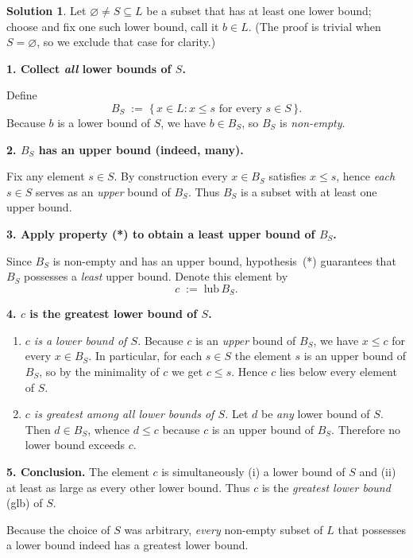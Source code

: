 \documentclass[12pt]{article}
\theoremstyle{definition} %
\newtheorem{solution}{Solution}
\theoremstyle{plain} %
\begin{document}
        \begin{solution}
        Let $\varnothing\neq S\subseteq L$ be a subset that has at least one lower bound;
        choose and fix one such lower bound, call it $b\in L$.
        (The proof is trivial when $S=\varnothing$, so we exclude that case for clarity.)
        
        \medskip
        \textbf{1.  Collect \emph{all} lower bounds of $S$.}
        
        Define
        \[
           B_S\;:=\;\bigl\{\,x\in L : x\le s \text{ for every } s\in S\,\bigr\}.
        \]
        Because $b$ is a lower bound of $S$, we have $b\in B_S$,
        so $B_S$ is \emph{non-empty}.
        
        \medskip
        \textbf{2.  $B_S$ has an upper bound (indeed, many).}
        
        Fix any element $s\in S$.
        By construction every $x\in B_S$ satisfies $x\le s$,
        hence \emph{each} $s\in S$ serves as an \emph{upper} bound of $B_S$.
        Thus $B_S$ is a subset with at least one upper bound.
        
        \medskip
        \textbf{3.  Apply property (*) to obtain a least upper bound of $B_S$.}
        
        Since $B_S$ is non-empty and has an upper bound,
        hypothesis~(*) guarantees that $B_S$ possesses a \emph{least} upper bound.
        Denote this element by
        \[
           c\;:=\;\text{lub}\, B_S.
        \]
        
        \medskip
        \textbf{4.  $c$ is the greatest lower bound of $S$.}
        
        \begin{enumerate}[label=(\alph*)]
        \item \emph{$c$ is a lower bound of $S$.}  
              Because $c$ is an \emph{upper} bound of $B_S$, we have $x\le c$ for every $x\in B_S$.
              In particular, for each $s\in S$ the element $s$ is an upper bound of $B_S$,
              so by the minimality of $c$ we get $c\le s$.
              Hence $c$ lies below every element of $S$.
        
        \item \emph{$c$ is \emph{greatest} among all lower bounds of $S$.}  
              Let $d$ be \emph{any} lower bound of $S$.
              Then $d\in B_S$, whence $d\le c$ because $c$ is an upper bound of $B_S$.
              Therefore no lower bound exceeds $c$.
        \end{enumerate}
        
        \medskip
        \textbf{5.  Conclusion.}
        The element $c$ is simultaneously
        (i) a lower bound of $S$ and (ii) at least as large as every other lower bound.
        Thus $c$ is the \emph{greatest lower bound} (glb) of $S$.
        
        \bigskip
        Because the choice of $S$ was arbitrary,
        \emph{every} non-empty subset of $L$ that possesses a lower bound
        indeed has a greatest lower bound.
        \end{solution}
\end{document}
